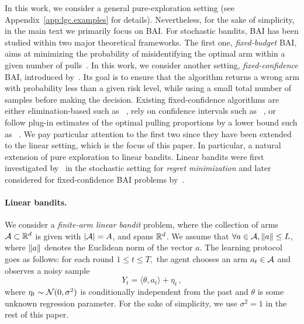 In this work, we consider a general pure-exploration setting (see Appendix~\ref{app:lgc.examples} for details). Nevertheless, for the sake of simplicity, in the main text we primarily focus on BAI.  For stochastic bandits, BAI has been studied within two major theoretical frameworks. The first one,  \emph{fixed-budget} BAI, aims at minimizing the probability of misidentifying the optimal arm within a given number of pulls~\citep{audibert2010budget}. In this work, we consider another setting, \emph{fixed-confidence} BAI, introduced by~\citet{even-dar2003confidence}. Its goal is to ensure that the algorithm returns a wrong arm with probability less than a given risk level, while using a small total number of samples before making the decision. %
Existing fixed-confidence algorithms are either elimination-based such as \SE~\citep{karnin2013sha}, rely on confidence intervals such as \UGapE~\citep{gabillon2012ugape}, or follow plug-in estimates of the optimal pulling proportions by a lower bound such as \Track~\citep{garivier2016tracknstop}. We pay particular attention to the first two since they have been extended to the linear setting, which is the focus of this paper.
In particular, a natural extension of pure exploration to linear bandits. Linear bandits were first investigated by~\citet{auer2002linear} in the stochastic setting for \emph{regret minimization} and later considered for fixed-confidence BAI problems by~\citet{soare2014linear}.
\paragraph{Linear bandits.}
We consider a \emph{finite-arm linear bandit} problem, where the collection of arms $\mathcal{A}\subset \mathbb{R}^d$ is given  with $|\mathcal{A}|=A$, and spans $\mathbb{R}^d$. We assume that $\forall a\in\mathcal{A}, \left\lVert a\right\rVert\leq L$, where $\left\lVert a\right\rVert$ denotes the Euclidean norm of the vector $a$. The learning protocol goes as follows: for each round $1\leq t \leq T,$ the agent chooses an arm $a_t\in\mathcal{A}$ and observes a noisy sample
\[
Y_t =\langle \theta,a_t\rangle +\eta_t\,,
\]
where $\eta_t \sim \mathcal{N}(0,\sigma^2)$ is conditionally independent from the past and $\theta$ is some unknown regression parameter. For the sake of simplicity, we use $\sigma^2 = 1$ in the rest of this paper.

